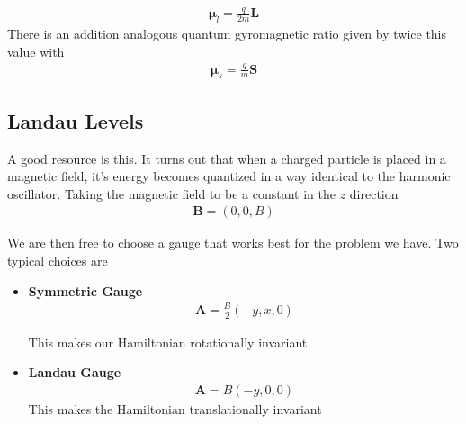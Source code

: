 \begin{align}
\boldsymbol{\mu}_l = \frac{q}{2m}\textbf{L}
\end{align}
There is an addition analogous quantum gyromagnetic ratio given by twice this value with
\begin{align}
\boldsymbol{\mu}_s = \frac{q}{m}\textbf{S}
\end{align}



\subsection{Landau Levels}
A good resource is this\cite{hitoshi}. It turns out that when a charged particle is placed in a magnetic field, it's energy becomes quantized in a way identical to the harmonic oscillator. Taking the magnetic field to be a constant in the $z$ direction
\begin{align}
\textbf{B} = (0,0,B)
\end{align}


 We are then free to choose a gauge that works best for the problem we have. Two typical choices are

\begin{itemize}
\item \textbf{Symmetric Gauge}
\begin{align}
\textbf{A} = \frac{B}{2}(-y,x,0)
\end{align}

This makes our Hamiltonian rotationally invariant


\item \textbf{Landau Gauge}
\begin{align}
\textbf{A} = B(-y,0,0)
\end{align}
This makes the Hamiltonian translationally invariant
\end{itemize}

